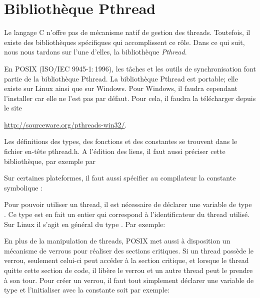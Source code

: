 \newcommand{\function}[1]{\section{#1}}

\chapter{Bibliothèque Pthread}
\startchapter

Le langage C n'offre pas de mécanisme natif de gestion des threads. Toutefois, il existe des bibliothèques spécifiques qui accomplissent ce rôle. Dans ce qui suit, nous nous tardons sur l'une d'elles, la bibliothèque \emph{Pthread}.

En POSIX (ISO/IEC 9945-1$:$1996), les tâches et les outils de synchronisation font partie de la bibliothèque Pthread.
La bibliothèque Pthread est portable; elle existe sur Linux ainsi que sur Windows. Pour Windows, il faudra cependant l'installer car elle ne l'est pas par défaut. Pour cela, il faudra la télécharger depuis le site

\hspace{1cm}\url{http://sourceware.org/pthreads-win32/}.

Les définitions des types, des fonctions et des constantes se trouvent dans le fichier en-tête pthread.h. A l'édition des liens, il faut aussi préciser cette bibliothèque, par exemple par

\hspace{1cm}

Sur certaines plateformes, il faut aussi spécifier au compilateur la constante symbolique :

\hspace{1cm}

Pour pouvoir utiliser un thread, il est nécessaire de déclarer une variable de type . Ce type est en fait un entier qui correspond à l'identificateur du thread utilisé. Sur Linux il s'agit en général du type . Par exemple:

\hspace{1cm}

En plus de la manipulation de threads, POSIX met aussi à disposition un mécanisme de verrous pour réaliser des sections critiques. Si un thread possède le verrou, seulement celui-ci peut accéder à la section critique, et lorsque le thread quitte cette section de code, il libère le verrou et un autre thread peut le prendre à son tour. Pour créer un verrou, il faut tout simplement déclarer une variable de type  et l'initialiser avec la constante  soit par exemple:

